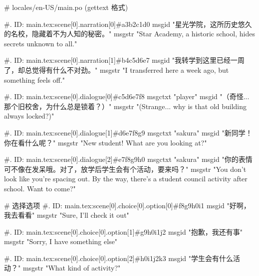 # locales/en-US/main.po (gettext 格式)

#. ID: main.tex:scene[0].narration[0]#a3b2c1d0
msgid "星光学院，这所历史悠久的名校，隐藏着不为人知的秘密。"
msgstr "Star Academy, a historic school, hides secrets unknown to all."

#. ID: main.tex:scene[0].narration[1]#b4c5d6e7
msgid "我转学到这里已经一周了，却总觉得有什么不对劲。"
msgstr "I transferred here a week ago, but something feels off."

#. ID: main.tex:scene[0].dialogue[0]#c5d6e7f8
msgctxt "player"
msgid "（奇怪...那个旧校舍，为什么总是锁着？）"
msgstr "(Strange... why is that old building always locked?)"

#. ID: main.tex:scene[0].dialogue[1]#d6e7f8g9
msgctxt "sakura"
msgid "新同学！你在看什么呢？"
msgstr "New student! What are you looking at?"

#. ID: main.tex:scene[0].dialogue[2]#e7f8g9h0
msgctxt "sakura"
msgid "你的表情可不像在发呆哦。对了，放学后学生会有个活动，要来吗？"
msgstr "You don't look like you're spacing out. By the way, there's a student council activity after school. Want to come?"

# 选择选项
#. ID: main.tex:scene[0].choice[0].option[0]#f8g9h0i1
msgid "好啊，我去看看"
msgstr "Sure, I'll check it out"

#. ID: main.tex:scene[0].choice[0].option[1]#g9h0i1j2
msgid "抱歉，我还有事"
msgstr "Sorry, I have something else"

#. ID: main.tex:scene[0].choice[0].option[2]#h0i1j2k3
msgid "学生会有什么活动？"
msgstr "What kind of activity?"






%

